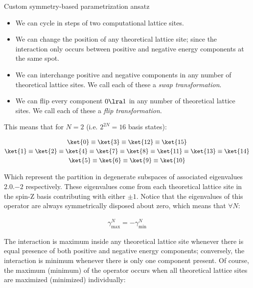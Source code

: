 \begin{frame}[allowframebreaks]{Custom symmetry-based parametrization ansatz}
	\medskip

	\begin{itemize}
	  \item We can cycle in steps of two computational lattice sites.
	  \item We can change the position of any theoretical lattice site; since the interaction only occurs between positive and negative energy components at the same spot.
	  \item We can interchange positive and negative components in any number of theoretical lattice sites. We call each of these a \emph{swap transformation}.
	  \item We can flip every component $0 \lra 1$ in any number of theoretical lattice sites. We call each of these a \emph{flip transformation}.
	\end{itemize}

	\medskip

	This means that for $N=2$ (i.e. $2^{2N}=16$ basis states):

	\begin{gather*}
	  \ket{0} \equiv \ket{3} \equiv \ket{12} \equiv \ket{15} \\
	  \ket{1} \equiv \ket{2} \equiv \ket{4} \equiv \ket{7} \equiv
	    \ket{8} \equiv \ket{11} \equiv \ket{13} \equiv \ket{14} \\
	  \ket{5} \equiv \ket{6} \equiv \ket{9} \equiv \ket{10}
	\end{gather*}

\break

	Which represent the partition in degenerate subspaces of associated eigenvalues $\qty{+2,0,-2}$ respectively. These eigenvalues come from each theoretical lattice site in the spin-Z basis contributing with either $\pm 1$. Notice that the eigenvalues of this operator are always symmetrically disposed about zero, which means that $\forall N$:

	\begin{gather*}
	  \gamma_{\text{max}}^{N} = - \gamma_{\text{min}}^{N}
	\end{gather*}

	The interaction is maximum inside any theoretical lattice site whenever there is equal presence of both positive and negative energy components; conversely, the interaction is minimum whenever there is only one component present. Of course, the maximum (minimum) of the operator occurs when all theoretical lattice sites are maximized (minimized) individually:


\end{frame}
